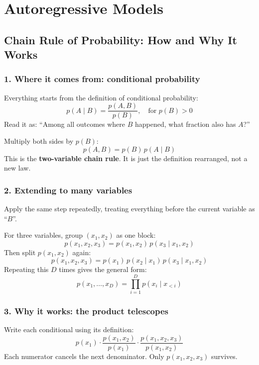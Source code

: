 \newpage

\section{Autoregressive Models}

\subsection*{Chain Rule of Probability: How and Why It Works}

\subsubsection*{1. Where it comes from: conditional probability}

Everything starts from the definition of conditional probability:
\[
p(A \mid B) = \frac{p(A, B)}{p(B)}, \quad \text{for } p(B) > 0
\]
Read it as: ``Among all outcomes where $B$ happened, what fraction also has $A$?''

Multiply both sides by $p(B)$:
\[
p(A, B) = p(B)\, p(A \mid B)
\]
This is the \textbf{two-variable chain rule}. It is just the definition rearranged, not a new law.

\subsubsection*{2. Extending to many variables}

Apply the same step repeatedly, treating everything before the current variable as ``$B$''.

For three variables, group $(x_1, x_2)$ as one block:
\[
p(x_1, x_2, x_3) = p(x_1, x_2)\, p(x_3 \mid x_1, x_2)
\]
Then split $p(x_1, x_2)$ again:
\[
p(x_1, x_2, x_3) = p(x_1)\, p(x_2 \mid x_1)\, p(x_3 \mid x_1, x_2)
\]
Repeating this $D$ times gives the general form:
\[
p(x_1, \dots, x_D) = \prod_{i=1}^{D} p(x_i \mid x_{<i})
\]

\subsubsection*{3. Why it works: the product telescopes}

Write each conditional using its definition:
\[
p(x_1) \cdot \frac{p(x_1, x_2)}{p(x_1)} \cdot \frac{p(x_1, x_2, x_3)}{p(x_1, x_2)}
\]
Each numerator cancels the next denominator. Only $p(x_1, x_2, x_3)$ survives.

